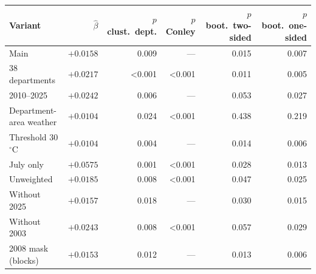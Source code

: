 \begin{tabular}{lrrrrr}
\toprule
Variant & $\hat\beta$ & $p$ clust.\ dept. & $p$ Conley & $p$ boot.\ two-sided & $p$ boot.\ one-sided \\
\midrule
Main & $+0.0158$ & 0.009 & --- & 0.015 & 0.007 \\
38 departments & $+0.0217$ & <0.001 & <0.001 & 0.011 & 0.005 \\
2010--2025 & $+0.0242$ & 0.006 & --- & 0.053 & 0.027 \\
Department-area weather & $+0.0104$ & 0.024 & <0.001 & 0.438 & 0.219 \\
Threshold 30\,$^{\circ}$C & $+0.0104$ & 0.004 & --- & 0.014 & 0.006 \\
July only & $+0.0575$ & 0.001 & <0.001 & 0.028 & 0.013 \\
Unweighted & $+0.0185$ & 0.008 & <0.001 & 0.047 & 0.025 \\
Without 2025 & $+0.0157$ & 0.018 & --- & 0.030 & 0.015 \\
Without 2003 & $+0.0243$ & 0.008 & <0.001 & 0.057 & 0.029 \\
2008 mask (blocks) & $+0.0153$ & 0.012 & --- & 0.013 & 0.006 \\
\bottomrule
\end{tabular}
